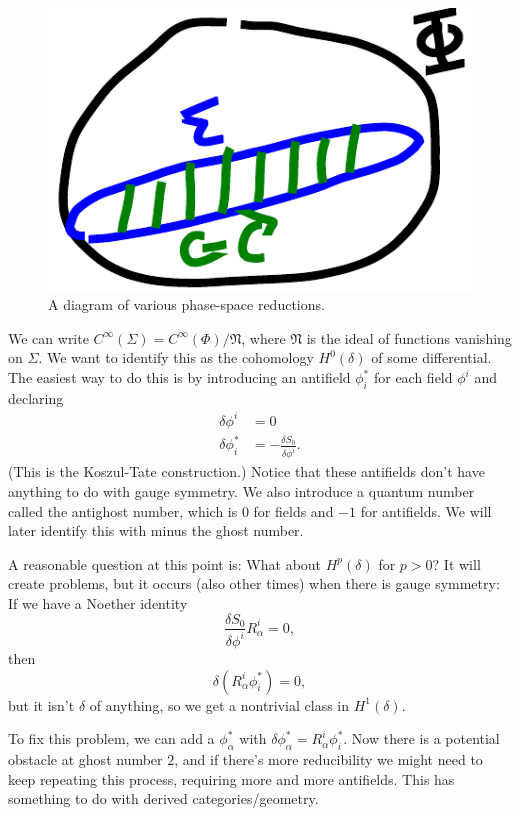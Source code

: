 \begin{figure}[h]
\centering\includegraphics{fig/phase-space.pdf}
\caption{A diagram of various phase-space reductions.}
\label{fig:phase-space}
\end{figure}

We can write $C^\infty(\Sigma) = C^\infty(\Phi)/\mathfrak{N}$, where $\mathfrak N$ is the ideal of functions vanishing on $\Sigma$.
We want to identify this as the cohomology $H^0(\delta)$ of some differential.
The easiest way to do this is by introducing an antifield $\phi_i^*$ for each field $\phi^i$ and declaring
\begin{align*}
\delta \phi^i &= 0\\
\delta \phi_i^* &= -\frac{\delta S_0}{\delta \phi^i}.
\end{align*}
(This is the Koszul-Tate construction.)
Notice that these antifields don't have anything to do with gauge symmetry.
We also introduce a quantum number  called the antighost number, which is $0$ for fields and $-1$ for antifields.
We will later identify this with minus the ghost number.

A reasonable question at this point is: What about $H^p(\delta)$ for $p > 0$?
It will create problems, but it occurs (also other times) when there is gauge symmetry: If we have a Noether identity
\[
\frac{\delta S_0}{\delta \phi^i} R_\alpha^i = 0,
\]
then
\[
\delta\left(R_\alpha^i \phi_i^* \right) = 0,
\]
but it isn't $\delta$ of anything, so we get a nontrivial class in $H^1(\delta)$.

To fix this problem, we can add a $\phi_\alpha^*$ with $\delta \phi_\alpha^* = R_\alpha^i \phi_i^*$.
Now there is a potential obstacle at ghost number $2$, and if there's more reducibility we might need to keep repeating this process, requiring more and more antifields.
This has something to do with derived categories/geometry.

